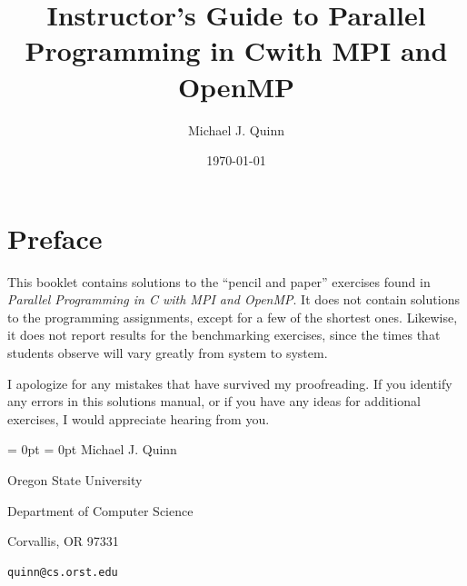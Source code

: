 

\setlength{\oddsidemargin}{1.5in}
\setlength{\evensidemargin}{0.5in}
\newcommand{\ip}[2]{(#1, #2)}
\renewcommand{\floatpagefraction}{0.8}
\renewcommand{\topfraction}{0.8}
\renewcommand{\textfraction}{0.1}

\def\pf{\sl}



\title{\bf Instructor's Guide to\linebreak
           Parallel Programming in C\linebreak with MPI and OpenMP}
\author{Michael J. Quinn}
\date{\today}
\frontmatter
\maketitle
\tableofcontents

\chapter{Preface}

This booklet contains solutions to the ``pencil and paper'' exercises found in
{\it Parallel Programming in C with MPI and OpenMP}.
It does not contain solutions to the programming assignments, except for
a few of the shortest ones.
Likewise, it does not report results for the benchmarking exercises, since
the times that students observe will vary greatly from system to system.

I apologize for any mistakes that have survived my proofreading.
If you identify any errors in this solutions manual,
or if you have any ideas for
additional exercises, I would appreciate hearing from you.

\baselineskip
{
\parindent = 0pt
\parskip = 0pt
Michael J. Quinn

Oregon State University

Department of Computer Science

Corvallis, OR 97331

\begin{verbatim}
quinn@cs.orst.edu
\end{verbatim}
}

\mainmatter
\renewcommand{\theenumi}{\arabic{chapter}.\arabic{enumi}}
\renewcommand{\labelenumi}{\theenumi}
